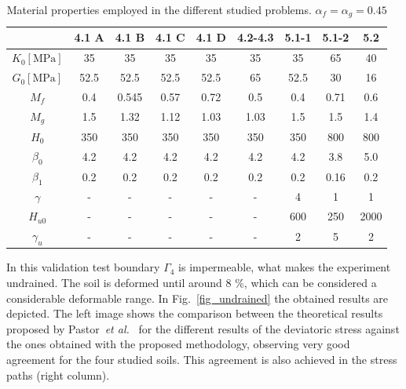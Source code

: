 \documentclass[preprint,12pt,a4paper]{elsarticle}
\begin{document}
\begin{table}
\caption{\label{tab3} Material properties employed in the different studied problems. $\alpha_f=\alpha_g=0.45$} 
\centering
	\begin{tabular}{c|c|c|c|c|c|c|c|c}
	& 4.1 A  & 4.1 B & 4.1 C & 4.1 D & 4.2-4.3 & 5.1-1 & 5.1-2 & 5.2 \\
	\hline
        $K_{0} \left[ \text{MPa} \right]$  & 35 & 35 & 35 & 35 & 35 & 35 & 65 & 40
        \\ 
        $G_{0} \left[ \text{MPa} \right]$ & 52.5 & 52.5 & 52.5 & 52.5 & 65 & 52.5 & 30 & 16
        \\
        \(M_{f}\)  & 0.4 & 0.545 & 0.57 & 0.72 & 0.5 & 0.4 & 0.71 & 0.6
        \\
        \(M_{g}\) & 1.5 & 1.32 & 1.12 & 1.03 & 1.03 & 1.5 & 1.5 & 1.4
        \\
        \(H_{0}\) & 350 & 350 & 350 & 350 & 350  & 350 & 800 & 800
        \\
        \(\beta_{0}\) & 4.2 & 4.2 & 4.2 & 4.2 & 4.2 & 4.2 & 3.8 & 5.0
        \\
        \(\beta_{1}\) & 0.2 & 0.2 & 0.2 & 0.2 & 0.2 & 0.2 & 0.16 & 0.2
        \\
        \( \gamma\)  & - & - & - & - & - & 4 & 1 & 1
        \\
        \(H_{u 0}\) & - & - & - & - & - & 600 & 250 & 2000
        \\
        \( \gamma_{u}\)  & - & - & - & - & - & 2 & 5 & 2
        \\
	\end{tabular}
\end{table}

In this validation test boundary $\Gamma_4$ is impermeable, what makes the experiment undrained. The soil is deformed until around 8 \%, which can be considered a considerable deformable range. In Fig.~\ref{fig_undrained} the obtained results are depicted. The left image shows the comparison between the theoretical results proposed by Pastor~\textit{et al.}~\cite{PastorZC:90} for the different results of the deviatoric stress against the ones obtained with the proposed methodology, observing very good agreement for the four studied soils. This agreement is also achieved in the stress paths (right column).
\end{document}
